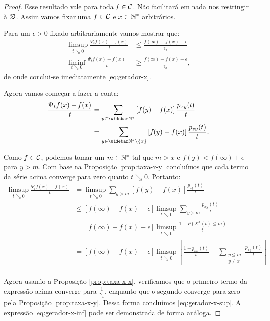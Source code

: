 \begin{proof}
  Esse resultado vale para toda $f \in {\mathcal{C}}$. Não facilitará em nada
  nos restringir à ${\mathfrak{D}}$. Assim vamos fixar uma $f \in {\mathcal{C}}$ e $x \in {\mathbb{N^*}}$
  arbitrários.

  Para um $\epsilon > 0$ fixado arbitrariamente vamos mostrar que:
  \begin{align}
    \label{eq:gerador-x-sup}
    \limsup_{t \searrow 0} \frac{\Psi_t f (x) - f(x)}{t} &\leq
    \frac{f(\infty) - f(x) + \epsilon}{\gamma_x}\\
    \label{eq:gerador-x-inf}
    \liminf_{t \searrow 0} \frac{\Psi_t f (x) - f(x)}{t} &\geq
    \frac{f(\infty) - f(x) - \epsilon}{\gamma_x}, 
  \end{align}
  de onde conclui-se imediatamente \eqref{eq:gerador-x}.

  Agora vamos começar a fazer a conta:
  \begin{align*}
    \frac{\Psi_t f(x) - f(x)}{t}
    &= \sum_{y \in \Nzb} \left[ f(y) - f(x) \right] \frac{p_{x y}(t)}{t}\\
    &=
    \sum_{y \in \Nzb\setminus\{x\}} \left[ f(y) - f(x) \right] \frac{p_{x y}(t)}{t}.
  \end{align*}


  Como $f \in {\mathcal{C}}$, podemos tomar um $m \in {\mathbb{N^*}}$ tal que $m > x$ e
  $f(y) < f(\infty) + \epsilon$ para $y > m$. Com base na Proposição
  \ref{prop:taxa-x-y} concluímos que cada termo da série acima
  converge para zero quanto $t \searrow 0$. Portanto:
  \begin{align*}
    \limsup_{t \searrow 0}
    \frac{\Psi_t f(x) - f(x)}{t}
    &= \limsup_{t \searrow 0}
    \sum_{y > m} \left[ f(y) - f(x) \right] \frac{p_{x y}(t)}{t}\\
    &\leq \left[ f(\infty) - f(x) + \epsilon \right] \limsup_{t \searrow 0} 
    \sum_{y > m} \frac{p_{x y}(t)}{t}\\
    &= \left[ f(\infty) - f(x) + \epsilon \right] \limsup_{t \searrow 0}
    \frac{1 - P\left( X^x(t) \leq m \right)}{t}\\
    &= \left[ f(\infty) - f(x) + \epsilon \right] \limsup_{t \searrow 0}
    \left[
      \frac{1 - p_{x x}(t)}{t}
      - \sum_{\substack{y \leq m \\ y\neq x}} \frac{p_{x y}(t)}{t}
    \right]\\
  \end{align*}

  Agora usando a Proposição \ref{prop:taxa-x-x}, verificamos que o
  primeiro termo da expressão acima converge para
  $\frac{1}{\gamma_x}$, enquanto que o segundo converge para zero pela
  Proposição \ref{prop:taxa-x-y}. Dessa forma concluímos
  \eqref{eq:gerador-x-sup}. A expressão \eqref{eq:gerador-x-inf} pode
  ser demonstrada de forma análoga.
\end{proof}


